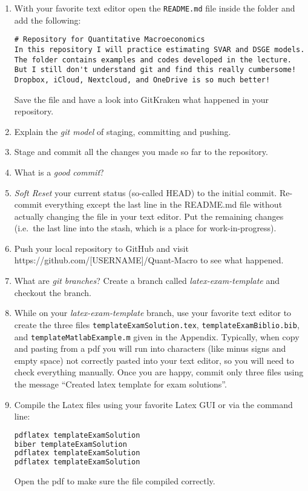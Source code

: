 \begin{enumerate}
\item
With your favorite text editor open the \texttt{README.md} file inside the folder and add the following:
\begin{lstlisting}[basicstyle=\scriptsize\mlttfamily]
# Repository for Quantitative Macroeconomics
In this repository I will practice estimating SVAR and DSGE models.
The folder contains examples and codes developed in the lecture.
But I still don't understand git and find this really cumbersome!
Dropbox, iCloud, Nextcloud, and OneDrive is so much better!
\end{lstlisting}
Save the file and have a look into GitKraken what happened in your repository.

\item
Explain the \emph{git model} of staging, committing and pushing.

\item
Stage and commit all the changes you made so far to the repository.

\item
What is a \emph{good commit}?

\item
\emph{Soft Reset} your current status (so-called HEAD) to the initial commit.
Re-commit everything except the last line in the README.md file without actually changing the file in your text editor.
Put the remaining changes (i.e.\ the last line into the stash, which is a place for work-in-progress).

\item
Push your local repository to GitHub and visit https://github.com/[USERNAME]/Quant-Macro to see what happened.

\item
What are \emph{git branches}?
Create a branch called \emph{latex-exam-template} and checkout the branch.

\item
While on your \emph{latex-exam-template} branch, use your favorite text editor
  to create the three files \texttt{templateExamSolution.tex}, \texttt{templateExamBiblio.bib}, and \texttt{templateMatlabExample.m} given in the Appendix.
Typically, when copy and pasting from a pdf you will run into characters (like minus signs and empty space) not correctly pasted into your text editor,
  so you will need to check everything manually.
Once you are happy, commit only three files using the message \enquote{Created latex template for exam solutions}.

\item
Compile the Latex files using your favorite Latex GUI or via the command line:
\begin{lstlisting}[language=tex,frame=single,basicstyle=\scriptsize\mlttfamily]
pdflatex templateExamSolution
biber templateExamSolution
pdflatex templateExamSolution
pdflatex templateExamSolution
\end{lstlisting}
Open the pdf to make sure the file compiled correctly.


\end{enumerate}
